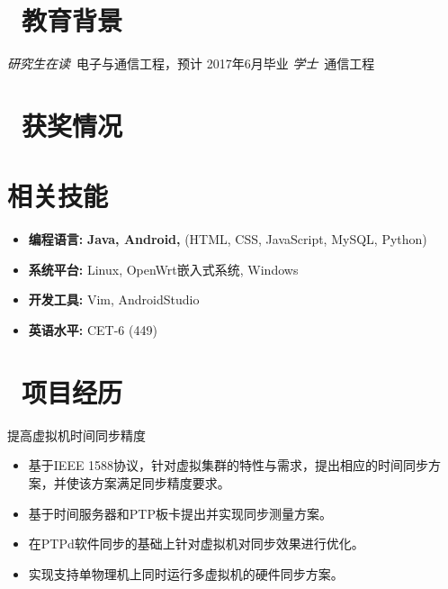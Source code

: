 \documentclass{resume}
\begin{document}



\section{\faGraduationCap\ 教育背景}
\textit{研究生在读}\ 电子与通信工程，预计 2017年6月毕业
\textit{学士}\ 通信工程

\section{\faTrophy\ 获奖情况}
\begin{onehalfspacing}
\end{onehalfspacing}

\section{\faCogs 相关技能}
\begin{itemize}[parsep=0.5ex]
  \item \textbf{编程语言:} \textbf{Java, Android,} (HTML, CSS, JavaScript, MySQL, Python)
  \item \textbf{系统平台:} Linux, OpenWrt嵌入式系统, Windows
  \item \textbf{开发工具:} Vim, AndroidStudio
  \item \textbf{英语水平:} CET-6 (449)
\end{itemize}

\section{\faUsers\ 项目经历}
\setlength{\parindent}{2em}提高虚拟机时间同步精度
\begin{onehalfspacing}
\begin{itemize}[leftmargin=5em]
  \item 基于IEEE 1588协议，针对虚拟集群的特性与需求，提出相应的时间同步方案，并使该方案满足同步精度要求。
  \item 基于时间服务器和PTP板卡提出并实现同步测量方案。
  \item 在PTPd软件同步的基础上针对虚拟机对同步效果进行优化。
  \item 实现支持单物理机上同时运行多虚拟机的硬件同步方案。
\end{itemize}
\end{onehalfspacing}
\end{document}
